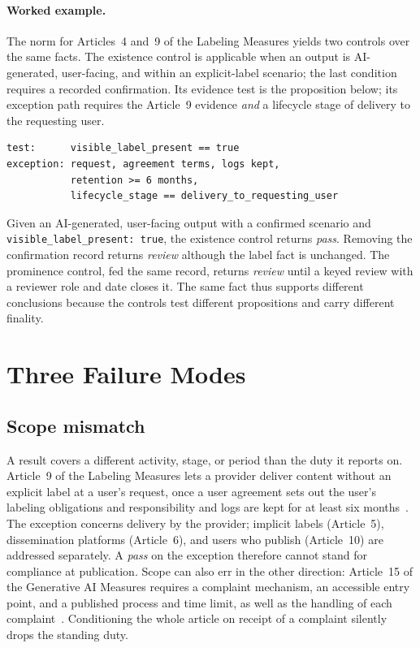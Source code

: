 \documentclass[sigconf,review,anonymous]{acmart}
\begin{document}
\paragraph{Worked example.} The norm for Articles~4 and~9 of the Labeling Measures yields two controls over the same facts. The existence control is applicable when an output is AI-generated, user-facing, and within an explicit-label scenario; the last condition requires a recorded confirmation. Its evidence test is the proposition below; its exception path requires the Article~9 evidence \emph{and} a lifecycle stage of delivery to the requesting user.

\begin{verbatim}
test:      visible_label_present == true
exception: request, agreement terms, logs kept,
           retention >= 6 months,
           lifecycle_stage == delivery_to_requesting_user
\end{verbatim}

\noindent Given an AI-generated, user-facing output with a confirmed scenario and \texttt{visible\_label\_present: true}, the existence control returns \emph{pass}. Removing the confirmation record returns \emph{review} although the label fact is unchanged. The prominence control, fed the same record, returns \emph{review} until a keyed review with a reviewer role and date closes it. The same fact thus supports different conclusions because the controls test different propositions and carry different finality.

\section{Three Failure Modes}

\subsection{Scope mismatch}

A result covers a different activity, stage, or period than the duty it reports on. Article~9 of the Labeling Measures lets a provider deliver content without an explicit label at a user's request, once a user agreement sets out the user's labeling obligations and responsibility and logs are kept for at least six months~\cite{aigcLabelingMeasures2025}. The exception concerns delivery by the provider; implicit labels (Article~5), dissemination platforms (Article~6), and users who publish (Article~10) are addressed separately. A \emph{pass} on the exception therefore cannot stand for compliance at publication. Scope can also err in the other direction: Article~15 of the Generative AI Measures requires a complaint mechanism, an accessible entry point, and a published process and time limit, as well as the handling of each complaint~\cite{genaiMeasures2023}. Conditioning the whole article on receipt of a complaint silently drops the standing duty.
\end{document}
